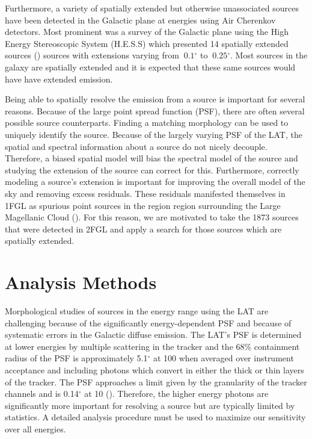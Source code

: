 \documentclass[12pt,preprint]{aastex}
\newcommand{\mev}{\text{MeV}\xspace}
\newcommand{\gev}{\text{GeV}\xspace}
\newcommand{\tev}{\text{TeV}\xspace}
\renewcommand{\deg}{\ensuremath{^\circ}\xspace}
\begin{document}
Furthermore, a variety of spatially extended but otherwise unassociated
sources have been detected in the Galactic plane at \tev energies using
Air Cherenkov detectors. Most prominent was a survey of the Galactic
plane using the High Energy Stereoscopic System (H.E.S.S) which presented
14 spatially extended sources (\cite{hess_plane_survey}) sources with
extensions varying from $~0.1\deg$ to $~0.25\deg$. Most \tev sources
in the galaxy are spatially extended and it is expected that these same
sources would have have extended \gev emission.

Being able to spatially resolve the \gev emission from a source is
important for several reasons. Because of the large point spread
function (PSF), there are often several possible source counterparts.
Finding a matching morphology can be used to uniquely identify the source.
Because of the largely varying PSF of the LAT, the spatial and spectral
information about a source do not nicely decouple. Therefore, a biased
spatial model will bias the spectral model of the source and studying
the extension of the source can correct for this.  Furthermore, correctly
modeling a source's extension is important for improving the overall model
of the sky and removing excess residuals.  These residuals manifested
themselves in 1FGL as spurious point sources in the region region
surrounding the Large Magellanic Cloud (\cite{first_cat}).  For this
reason, we are motivated to take the 1873 sources that were detected in
2FGL and apply a search for those sources which are spatially extended.

\section{Analysis Methods}

Morphological studies of sources in the \gev energy range
using the LAT are challenging because of the significantly 
energy-dependent PSF and because of systematic errors in the Galactic diffuse
emission.  The LAT's PSF is determined at lower energies by multiple
scattering in the tracker and the 68\% containment radius of the PSF is
approximately 5.1\deg at 100 \mev  when averaged over instrument acceptance
and including photons which convert in either the thick or thin layers of
the tracker. The PSF approaches a limit given by the granularity of the
tracker channels and is 0.14\deg at 10 \gev (\cite{on_orbit_calibration}).
Therefore, the higher energy photons are significantly more important for
resolving a source but are typically limited by statistics. 
A detailed analysis procedure must be used to maximize our
sensitivity over all energies.
\end{document}
